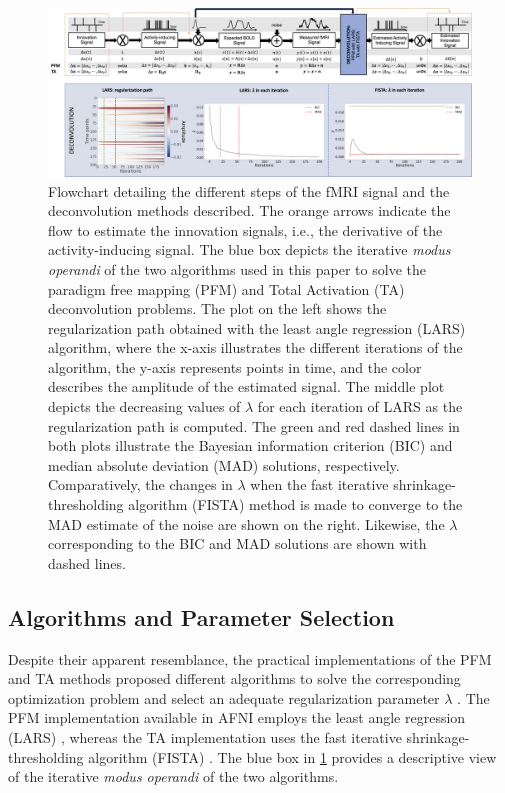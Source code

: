 \begin{figure}[t!]
    \begin{center}
        \includegraphics[width=\textwidth]{figures/synthesis_analysis/flowchart.png}
    \end{center}
    \caption{Flowchart detailing the different steps of the fMRI signal and the
    deconvolution methods described. The orange arrows indicate the flow to
    estimate the innovation signals, i.e., the derivative of the
    activity-inducing signal. The blue box depicts the iterative \textit{modus
    operandi} of the two algorithms used in this paper to solve the paradigm
    free mapping (PFM) and Total Activation (TA) deconvolution problems. The plot on the
    left shows the regularization path obtained with the least angle regression
    (LARS) algorithm, where the x-axis illustrates the different iterations of
    the algorithm, the y-axis represents points in time, and the color describes
    the amplitude of the estimated signal. The middle plot depicts the
    decreasing values of $\lambda$ for each iteration of LARS as the
    regularization path is computed. The green and red dashed lines in both
    plots illustrate the Bayesian information criterion (BIC) and median
    absolute deviation (MAD) solutions, respectively. Comparatively, the changes
    in $\lambda$ when the fast iterative shrinkage-thresholding algorithm
    (FISTA) method is made to converge to the MAD estimate of the noise are
    shown on the right. Likewise, the $\lambda$ corresponding to the BIC and MAD
    solutions are shown with dashed lines.}
\label{fig:flowchart}
\end{figure}

\subsection{Algorithms and Parameter Selection}
\label{sec:regparam}
Despite their apparent resemblance, the practical implementations of the PFM and
TA methods proposed different algorithms to solve the corresponding optimization
problem and select an adequate regularization parameter $\lambda$
\citep{Gaudes2013Paradigmfreemapping,Karahanoglu2013TotalactivationfMRI}. The
PFM implementation available in AFNI employs the least angle regression (LARS)
\citep{Efron2004Leastangleregression}, whereas the TA implementation uses the
fast iterative shrinkage-thresholding algorithm (FISTA)
\citep{Beck2009FastIterativeShrinkage}. The blue box in \cref{fig:flowchart}
provides a descriptive view of the iterative \textit{modus operandi} of the two
algorithms.

